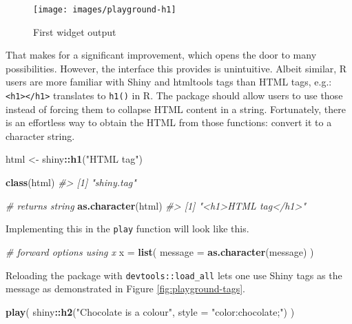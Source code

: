 \documentclass[10pt,]{krantz}
\makeatletter
\newenvironment{Shaded}{\begin{snugshade}}{\end{snugshade}}
\newcommand{\CommentTok}[1]{\textcolor[rgb]{0.37,0.37,0.37}{\textit{#1}}}
\newcommand{\DataTypeTok}[1]{\textcolor[rgb]{0.27,0.27,0.27}{#1}}
\newcommand{\KeywordTok}[1]{\textcolor[rgb]{0.27,0.27,0.27}{\textbf{#1}}}
\newcommand{\NormalTok}[1]{#1}
\newcommand{\OperatorTok}[1]{\textcolor[rgb]{0.43,0.43,0.43}{\textbf{#1}}}
\newcommand{\StringTok}[1]{\textcolor[rgb]{0.5,0.5,0.5}{#1}}
\newenvironment{kframe}{%
\medskip{}
\setlength{\fboxsep}{.8em}
 \def\at@end@of@kframe{}%
 \ifinner\ifhmode%
  \def\at@end@of@kframe{\end{minipage}}%
  \begin{minipage}{\columnwidth}%
 \fi\fi%
 \def\FrameCommand##1{\hskip\@totalleftmargin \hskip-\fboxsep
 \colorbox{shadecolor}{##1}\hskip-\fboxsep
     \hskip-\linewidth \hskip-\@totalleftmargin \hskip\columnwidth}%
 \MakeFramed {\advance\hsize-\width
   \@totalleftmargin\z@ \linewidth\hsize
   \@setminipage}}%
 {\par\unskip\endMakeFramed%
 \at@end@of@kframe}
\renewenvironment{Shaded}{\begin{kframe}}{\end{kframe}}
\makeatother
\begin{document}
\begin{figure}[H]

{\centering \texttt{[image: images/playground-h1]} 

}

\caption{First widget output}\label{fig:playground-h1}
\end{figure}

That makes for a significant improvement, which opens the door to many possibilities. However, the interface this provides is unintuitive. Albeit similar, R users are more familiar with Shiny and htmltools \citep{R-htmltools} tags than HTML tags, e.g.: \texttt{\textless{}h1\textgreater{}\textless{}/h1\textgreater{}} translates to \texttt{h1()} in R. The package should allow users to use those instead of forcing them to collapse HTML content in a string. Fortunately, there is an effortless way to obtain the HTML from those functions: convert it to a character string.

\begin{Shaded}
\begin{Highlighting}[]
\NormalTok{html <-}\StringTok{ }\NormalTok{shiny}\OperatorTok{::}\KeywordTok{h1}\NormalTok{(}\StringTok{"HTML tag"}\NormalTok{)}

\KeywordTok{class}\NormalTok{(html)}
\CommentTok{#> [1] "shiny.tag"}

\CommentTok{# returns string}
\KeywordTok{as.character}\NormalTok{(html)}
\CommentTok{#> [1] "<h1>HTML tag</h1>"}
\end{Highlighting}
\end{Shaded}

Implementing this in the \texttt{play} function will look like this.

\begin{Shaded}
\begin{Highlighting}[]
\CommentTok{# forward options using x}
\NormalTok{x =}\StringTok{ }\KeywordTok{list}\NormalTok{(}
  \DataTypeTok{message =} \KeywordTok{as.character}\NormalTok{(message)}
\NormalTok{)}
\end{Highlighting}
\end{Shaded}

Reloading the package with \texttt{devtools::load\_all} lets one use Shiny tags as the message as demonstrated in Figure \ref{fig:playground-tags}.

\begin{Shaded}
\begin{Highlighting}[]
\KeywordTok{play}\NormalTok{(}
\NormalTok{  shiny}\OperatorTok{::}\KeywordTok{h2}\NormalTok{(}\StringTok{"Chocolate is a colour"}\NormalTok{, }\DataTypeTok{style =} \StringTok{"color:chocolate;"}\NormalTok{)}
\NormalTok{)}
\end{Highlighting}
\end{Shaded}
\end{document}
